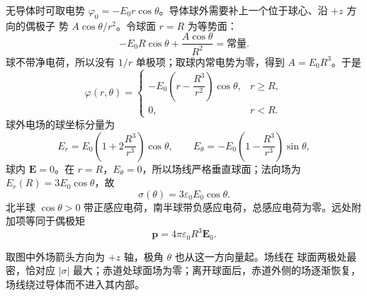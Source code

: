 \begin{xesolution}
无导体时可取电势 $\varphi_0=-E_0r\cos\theta$。导体球外需要补上一个位于球心、沿 $+z$ 方向的偶极子
势 $A\cos\theta/r^2$。令球面 $r=R$ 为等势面：
\[
  -E_0R\cos\theta+\frac{A\cos\theta}{R^2}=\text{常量}.
\]
球不带净电荷，所以没有 $1/r$ 单极项；取球内常电势为零，得到 $A=E_0R^3$。于是
\[
  \boxed{\varphi(r,\theta)=
  \begin{cases}
    -E_0\left(r-\dfrac{R^3}{r^2}\right)\cos\theta,&r\ge R,\\[6pt]
    0,&r<R.
  \end{cases}}
\]
球外电场的球坐标分量为
\[
  \boxed{E_r=E_0\left(1+2\frac{R^3}{r^3}\right)\cos\theta,
  \qquad
  E_\theta=-E_0\left(1-\frac{R^3}{r^3}\right)\sin\theta},
\]
球内 $\boldsymbol E=0$。在 $r=R$，$E_\theta=0$，所以场线严格垂直球面；法向场为
$E_r(R)=3E_0\cos\theta$，故
\[
  \boxed{\sigma(\theta)=3\varepsilon_0E_0\cos\theta}.
\]
北半球 $\cos\theta>0$ 带正感应电荷，南半球带负感应电荷，总感应电荷为零。远处附加项等同于偶极矩
\[
  \boxed{\boldsymbol p=4\pi\varepsilon_0R^3\boldsymbol E_0}.
\]

\uniformFieldSphereFigure
{}

取图中外场箭头方向为 $+z$ 轴，极角 $\theta$ 也从这一方向量起。场线在
球面两极处最密，恰对应 $|\sigma|$ 最大；赤道处球面场为零；离开球面后，赤道外侧的场逐渐恢复，场线绕过导体而不进入其内部。
\end{xesolution}
